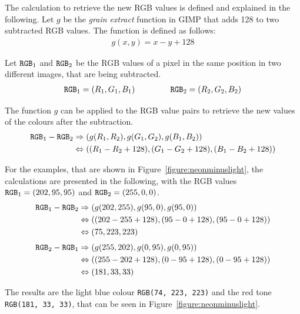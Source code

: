 \documentclass[../MasterThesis.tex]{subfiles}
\begin{document}
The calculation to retrieve the new RGB values is defined and explained in the following.
Let $g$ be the \textit{grain extract} function in GIMP that adds 128 to two subtracted RGB values. The function is defined as follows:
%
\begin{align*}
	g(x, y) = x - y + 128
\end{align*}

Let $\text{\texttt{RGB}}_1$ and $\text{\texttt{RGB}}_2$ be the RGB values of a pixel in the same position in two different images, that are being subtracted.
%
\begin{align*}
	\text{\texttt{RGB}}_1 = (R_1, G_1, B_1) \ \ \ \ \ \ \ \ \ \ \ \ \ 
	\text{\texttt{RGB}}_2 = (R_2, G_2, B_2)
\end{align*}

The function $g$ can be applied to the RGB value pairs to retrieve the new values of the colours after the subtraction.
%
\begin{align*}
	\text{\texttt{RGB}}_1 - \text{\texttt{RGB}}_2 & \Rightarrow (g(R_1, R_2), g(G_1, G_2), g(B_1, B_2)) \\
	 & \Leftrightarrow ((R_1 - R_2 + 128), (G_1 - G_2 + 128) , (B_1 - B_2 + 128)) 
\end{align*}


For the examples, that are shown in Figure~\ref{figure:neonminuslight}, the calculations are presented in the following, with the RGB values $\text{\texttt{RGB}}_1 = (202, 95, 95)$ and
$\text{\texttt{RGB}}_2 = (255, 0, 0)$.
%
\begin{align*}
	\text{\texttt{RGB}}_1 - \text{\texttt{RGB}}_2 & \Rightarrow (g(202, 255), g(95, 0), g(95, 0)) \\
	 & \Leftrightarrow ((202 - 255 + 128), (95 - 0 + 128) , (95 - 0 + 128)) \\
	 & \Leftrightarrow (75, 223, 223) 
\end{align*}
%
%
\begin{align*}
	\text{\texttt{RGB}}_2 - \text{\texttt{RGB}}_1 & \Rightarrow (g(255, 202), g(0, 95), g(0, 95)) \\
	 & \Leftrightarrow ((255 - 202 + 128), (0 - 95 + 128) , (0 - 95 + 128)) \\
	 & \Leftrightarrow (181, 33, 33) 
\end{align*}

The results are the light blue colour \texttt{RGB(74, 223, 223)} and the red tone \texttt{RGB(181, 33, 33)}, that can be seen in Figure~\ref{figure:neonminuslight}. 




















	
	
	
	
\end{document}
